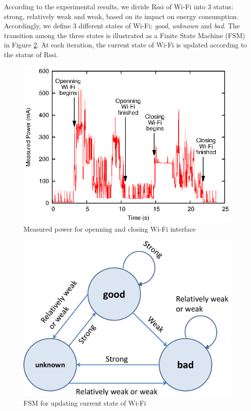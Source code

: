 \documentclass[journal]{IEEEtran}
\begin{document}
According to the experimental results,
we divide Rssi of Wi-Fi into 3 status: strong, relatively weak and weak, 
based on its impact on energy consumption. Accordingly, 
we define 3 different states of Wi-Fi: \textit{good}, \textit{unknown} and \textit{bad}. 
The transition among the three states is illustrated as a Finite State Machine (FSM) in Figure \ref{FSM}. 
At each iteration, the current state of Wi-Fi is updated according to the status of Rssi.

\begin{figure}
\centering
\includegraphics[scale=0.95]{energy_open_close_wifi.eps}
\caption{Measured power for openning and closing Wi-Fi interface}
\label{energy_open_close_wifi}
\end{figure}

\begin{figure}
\centering
\includegraphics[scale=0.35]{FSM.pdf}
\caption{FSM for updating current state of Wi-Fi}
\label{FSM}
\end{figure}
\end{document}
